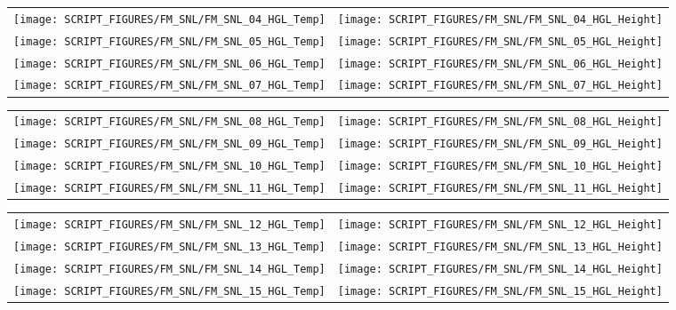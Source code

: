 \newpage

\begin{figure}[p]
\begin{tabular*}{\textwidth}{l@{\extracolsep{\fill}}r}
\texttt{[image: SCRIPT\_FIGURES/FM\_SNL/FM\_SNL\_04\_HGL\_Temp]} &
\texttt{[image: SCRIPT\_FIGURES/FM\_SNL/FM\_SNL\_04\_HGL\_Height]} \\
\texttt{[image: SCRIPT\_FIGURES/FM\_SNL/FM\_SNL\_05\_HGL\_Temp]} &
\texttt{[image: SCRIPT\_FIGURES/FM\_SNL/FM\_SNL\_05\_HGL\_Height]} \\
\texttt{[image: SCRIPT\_FIGURES/FM\_SNL/FM\_SNL\_06\_HGL\_Temp]} &
\texttt{[image: SCRIPT\_FIGURES/FM\_SNL/FM\_SNL\_06\_HGL\_Height]} \\
\texttt{[image: SCRIPT\_FIGURES/FM\_SNL/FM\_SNL\_07\_HGL\_Temp]} &
\texttt{[image: SCRIPT\_FIGURES/FM\_SNL/FM\_SNL\_07\_HGL\_Height]}
\end{tabular*}
\end{figure}

\begin{figure}[p]
\begin{tabular*}{\textwidth}{l@{\extracolsep{\fill}}r}
\texttt{[image: SCRIPT\_FIGURES/FM\_SNL/FM\_SNL\_08\_HGL\_Temp]} &
\texttt{[image: SCRIPT\_FIGURES/FM\_SNL/FM\_SNL\_08\_HGL\_Height]} \\
\texttt{[image: SCRIPT\_FIGURES/FM\_SNL/FM\_SNL\_09\_HGL\_Temp]} &
\texttt{[image: SCRIPT\_FIGURES/FM\_SNL/FM\_SNL\_09\_HGL\_Height]} \\
\texttt{[image: SCRIPT\_FIGURES/FM\_SNL/FM\_SNL\_10\_HGL\_Temp]} &
\texttt{[image: SCRIPT\_FIGURES/FM\_SNL/FM\_SNL\_10\_HGL\_Height]} \\
\texttt{[image: SCRIPT\_FIGURES/FM\_SNL/FM\_SNL\_11\_HGL\_Temp]} &
\texttt{[image: SCRIPT\_FIGURES/FM\_SNL/FM\_SNL\_11\_HGL\_Height]}
\end{tabular*}
\end{figure}

\begin{figure}[p]
\begin{tabular*}{\textwidth}{l@{\extracolsep{\fill}}r}
\texttt{[image: SCRIPT\_FIGURES/FM\_SNL/FM\_SNL\_12\_HGL\_Temp]} &
\texttt{[image: SCRIPT\_FIGURES/FM\_SNL/FM\_SNL\_12\_HGL\_Height]} \\
\texttt{[image: SCRIPT\_FIGURES/FM\_SNL/FM\_SNL\_13\_HGL\_Temp]} &
\texttt{[image: SCRIPT\_FIGURES/FM\_SNL/FM\_SNL\_13\_HGL\_Height]} \\
\texttt{[image: SCRIPT\_FIGURES/FM\_SNL/FM\_SNL\_14\_HGL\_Temp]} &
\texttt{[image: SCRIPT\_FIGURES/FM\_SNL/FM\_SNL\_14\_HGL\_Height]} \\
\texttt{[image: SCRIPT\_FIGURES/FM\_SNL/FM\_SNL\_15\_HGL\_Temp]} &
\texttt{[image: SCRIPT\_FIGURES/FM\_SNL/FM\_SNL\_15\_HGL\_Height]}
\end{tabular*}
\end{figure}



